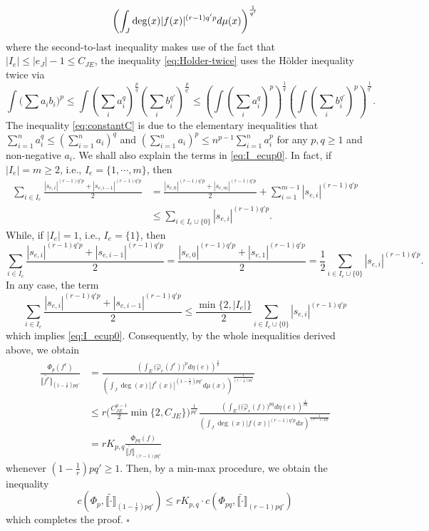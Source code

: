 \documentclass[12pt,a4paper]{article}
\newenvironment{proof}{\medskip\noindent{\bf Proof. }}{\hfill$\square$\medskip}
\begin{document}
\begin{proof}
\begin{align}
\left(\int_J \deg(x)|f(x)|^{(r-1)q'p}d\mu(x)\right)^{\frac{1}{q'}} \notag
\end{align}
where the second-to-last inequality makes use of the fact that $|I_e|\le |e_J|-1\le C_{JE}$, the inequality \eqref{eq:Holder-twice} uses the H\"older inequality twice via 
$$ \int \Big(\sum a_ib_i\Big)^p\le \int (\sum_ia_i^q)^{\frac pq}(\sum_ib_i^{q'})^{\frac {p}{q'}}\le \left(\int (\sum_ia_i^q)^p\right)^{\frac1q}\left(\int (\sum_ib_i^{q'})^p\right)^{\frac{1}{q'}}.$$
The inequality \eqref{eq:constantC} is due to the elementary inequalities that $\sum_{i=1}^n a_i^q\le (\sum_{i=1}^n a_i)^q$ and $(\sum_{i=1}^n a_i)^p\le n^{p-1}\sum_{i=1}^n a_i^p $ for any $p,q\ge 1$ and non-negative $a_i$. 
We shall also explain the terms in \eqref{eq:I_ecup0}. In fact, if $|I_e|=m\ge 2$, i.e., $I_e=\{1,\cdots,m\}$, then
\begin{align*}
\sum_{i\in I_e} \frac{|s_{e,i}|^{(r-1)q'p}+|s_{e,i-1}|^{(r-1)q'p}}{2} &=\frac{|s_{e,0}|^{(r-1)q'p}+|s_{e,m}|^{(r-1)q'p}}{2}+\sum_{i=1}^{m-1}|s_{e,i}|^{(r-1)q'p}
\\&\le \sum_{i\in I_e\cup\{0\}} |s_{e,i}|^{(r-1)q'p}.   
\end{align*}
 While, if $|I_e|=1$, i.e., $I_e=\{1\}$, then 
 $$\sum_{i\in I_e} \frac{|s_{e,i}|^{(r-1)q'p}+|s_{e,i-1}|^{(r-1)q'p}}{2} =\frac{|s_{e,0}|^{(r-1)q'p}+|s_{e,1}|^{(r-1)q'p}}{2}=\frac{1}{2}\sum_{i\in I_e\cup\{0\}} |s_{e,i}|^{(r-1)q'p}.$$
In any case, the term
$$\sum_{i\in I_e} \frac{|s_{e,i}|^{(r-1)q'p}+|s_{e,i-1}|^{(r-1)q'p}}{2}\le \frac{\min\{2,|I_e|\}}{2}\sum_{i\in I_e\cup\{0\}} |s_{e,i}|^{(r-1)q'p} $$
which implies \eqref{eq:I_ecup0}. 
Consequently, by the whole inequalities derived above, we obtain 
\begin{align*}
\frac{\Phi_p(f^r)}{\widetilde{\llbracket f^r\rrbracket}_{(1-\frac1r)pq'}}&=\frac{\left(\int_E\big(\widehat{\varphi}_e(f^r)\big)^pd\eta(e)\right)^{\frac1p}}{\left(\int_J\deg(x)|f^r(x)|^{(1-\frac1r)pq'}d\mu(x)\right)^{\frac{1}{(1-\frac1r)pq'}}} 
\\ &\le r \big(\frac{C_{JE}^{p-1}}{2}\min \{2,C_{JE}\}\big)^{\frac{1}{pq'}} \frac{\left(\int_E\big((\widehat{\varphi}_e(f)\big)^{pq}d\eta(e)\right)^{\frac{1}{pq}}}{\left(\int_J \deg(x)|f(x)|^{(r-1)q'p}dx\right)^{\frac{1}{(r-1)pq'}}}
\\&=rK_{p,q}\frac{\Phi_{pq}(f)}{\widetilde{\llbracket f\rrbracket}_{(r-1)pq'}}    
\end{align*}
whenever $(1-\frac1r)pq'\ge1$. 
Then, by a min-max procedure, we obtain the inequality
$$c(\Phi_p,\widetilde{\llbracket \cdot\rrbracket}_{  (1-\frac1r)pq' })\le r K_{p,q}\cdot   c(\Phi_{pq},\widetilde{\llbracket \cdot\rrbracket}_{(r-1)pq'})$$ 
which completes the proof.
\end{proof}
\end{document}
